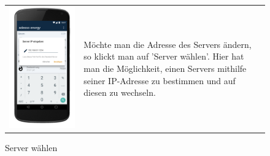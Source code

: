 \begin{figure}[h]
\begin{tabularx}{\textwidth}{X  X}
	\includegraphics[scale = 0.155]{img/AndroidMockup/serverLocation} \caption{Server wählen} & Möchte man die Adresse des Servers ändern, so klickt man auf 'Server wählen'. Hier hat man die Möglichkeit, einen Servers mithilfe seiner IP-Adresse zu bestimmen und auf diesen zu wechseln. \\

\end{tabularx}
\end{figure}
